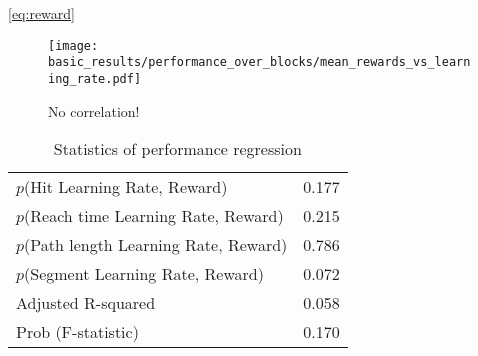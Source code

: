 \documentclass[../main.tex]{subfiles}
\begin{document}
\cref{eq:reward}


\begin{figure}[H]
    \centering
    \texttt{[image: basic\_results/performance\_over\_blocks/mean\_rewards\_vs\_learning\_rate.pdf]}
    \caption[Reward versus learning rate]{No correlation!}\label{fig:mean_rewards_vs_learning_rate}
\end{figure}


\begin{table}[H]
    \begin{center}
        \caption[Statistics of performance regression]{Statistics of performance regression}\label{tab:performance_stats}
        \begin{tabular}{l | c}
            \hline
            $p$(Hit Learning Rate, Reward) & 0.177 \\
            $p$(Reach time Learning Rate, Reward) & 0.215 \\
            $p$(Path length Learning Rate, Reward) & 0.786 \\
            $p$(Segment Learning Rate, Reward) & 0.072 \\
            Adjusted R-squared & 0.058 \\
            Prob (F-statistic) & 0.170
        \end{tabular}
    \end{center}
  \end{table}
  
\end{document}
